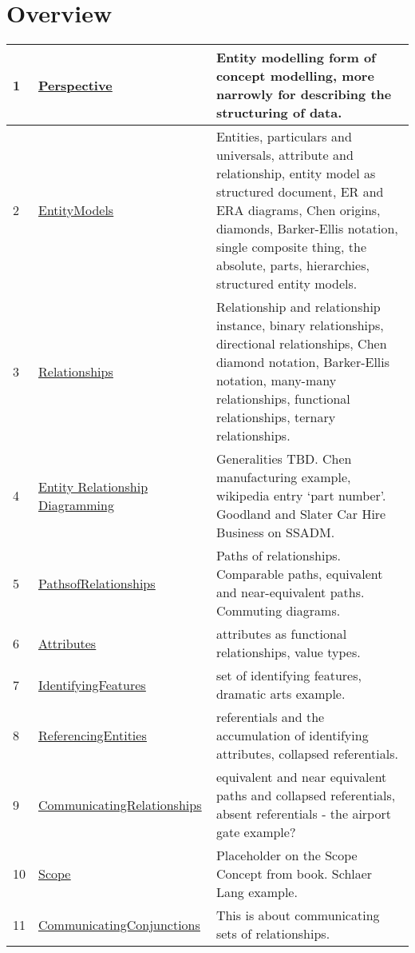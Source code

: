 
\newcommand{\mysection}[1]{\underline{\hyperref[#1]{#1}}}
\section*{Overview}
\label{Overview}
\begin{tabular}{l l p{7cm}}
1 & \mysection{Perspective} & Entity modelling form of concept modelling, more narrowly for describing the structuring of data.\\
\hline
2 & \mysection{EntityModels} & Entities, particulars and universals, attribute and relationship, entity model as structured document, ER and ERA diagrams, Chen origins, diamonds, Barker-Ellis notation, single composite thing, the absolute, parts, hierarchies, structured entity models.\\
\hline
3 & \mysection{Relationships} & Relationship and relationship instance, binary relationships, directional relationships, Chen diamond notation, Barker-Ellis notation, many-many relationships, functional relationships, ternary relationships. \\
\hline
4 & \mysection{Entity Relationship Diagramming} & Generalities TBD. Chen manufacturing example, wikipedia entry `part number'.
                                     Goodland and Slater Car Hire Business on SSADM.\\
\hline
5 & \mysection{PathsofRelationships} & Paths of relationships. Comparable paths, equivalent and near-equivalent paths. Commuting diagrams.\\
\hline
6 & \mysection{Attributes} & attributes as functional relationships, value types.
\\
\hline
7 & \mysection{IdentifyingFeatures} &  set of identifying features, dramatic arts example.\\
\hline
8 & \mysection{ReferencingEntities} &  referentials and the accumulation of identifying attributes, collapsed referentials.\\
\hline
9 & \mysection{CommunicatingRelationships} & equivalent and near equivalent paths and collapsed referentials, absent referentials - the airport gate example? \\
\hline
10 & \mysection{Scope} & Placeholder on the Scope Concept from book.   Schlaer Lang example. \\
\hline
11 & \mysection{CommunicatingConjunctions} & This is about communicating sets of relationships. 

\end{tabular}

